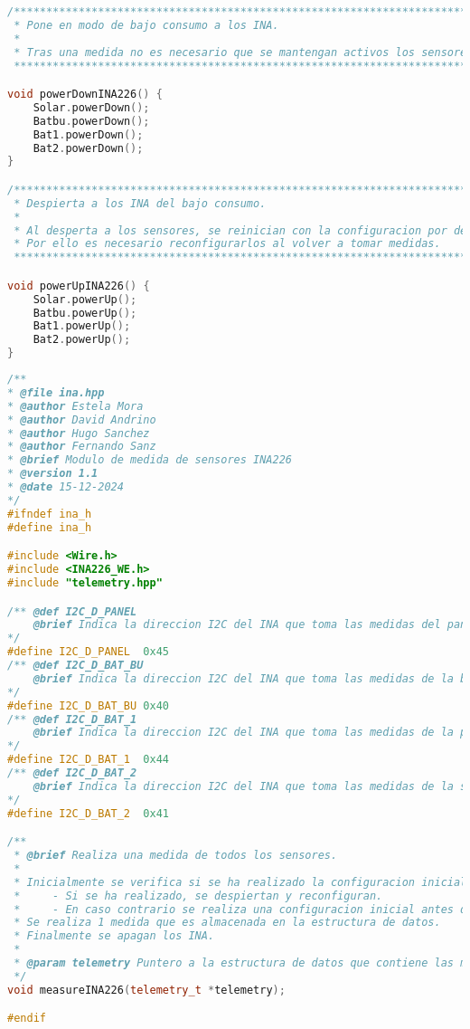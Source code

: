 \begin{lstlisting}[language=c++,caption={Fichero\texttt{ina.cpp}}, captionpos=b]
/**************************************************************************//**
 * Pone en modo de bajo consumo a los INA.
 *
 * Tras una medida no es necesario que se mantengan activos los sensores por lo que es necesario ponerlos a bajo consumo.
 ******************************************************************************/

void powerDownINA226() {
    Solar.powerDown();
    Batbu.powerDown();
    Bat1.powerDown();
    Bat2.powerDown();
}

/**************************************************************************//**
 * Despierta a los INA del bajo consumo.
 *
 * Al desperta a los sensores, se reinician con la configuracion por defecto.
 * Por ello es necesario reconfigurarlos al volver a tomar medidas.
 ******************************************************************************/

void powerUpINA226() {
    Solar.powerUp();
    Batbu.powerUp();
    Bat1.powerUp();
    Bat2.powerUp();
}
\end{lstlisting}

\begin{lstlisting}[language=c++,caption={Fichero\texttt{ina.hpp}}, captionpos=b]
/**
* @file ina.hpp
* @author Estela Mora
* @author David Andrino
* @author Hugo Sanchez
* @author Fernando Sanz
* @brief Modulo de medida de sensores INA226
* @version 1.1
* @date 15-12-2024
*/
#ifndef ina_h
#define ina_h

#include <Wire.h>
#include <INA226_WE.h>
#include "telemetry.hpp"

/** @def I2C_D_PANEL
    @brief Indica la direccion I2C del INA que toma las medidas del panel solar.
*/
#define I2C_D_PANEL  0x45
/** @def I2C_D_BAT_BU
    @brief Indica la direccion I2C del INA que toma las medidas de la bateria de BackUp.
*/
#define I2C_D_BAT_BU 0x40
/** @def I2C_D_BAT_1
    @brief Indica la direccion I2C del INA que toma las medidas de la primera bateria.
*/
#define I2C_D_BAT_1  0x44
/** @def I2C_D_BAT_2
    @brief Indica la direccion I2C del INA que toma las medidas de la segunda bateria.
*/
#define I2C_D_BAT_2  0x41

/**
 * @brief Realiza una medida de todos los sensores.
 *
 * Inicialmente se verifica si se ha realizado la configuracion inicial de los INAs.
 *     - Si se ha realizado, se despiertan y reconfiguran.
 *     - En caso contrario se realiza una configuracion inicial antes de la captacion de datos.
 * Se realiza 1 medida que es almacenada en la estructura de datos.
 * Finalmente se apagan los INA.
 * 
 * @param telemetry Puntero a la estructura de datos que contiene las medidas.
 */
void measureINA226(telemetry_t *telemetry);

#endif
\end{lstlisting}

